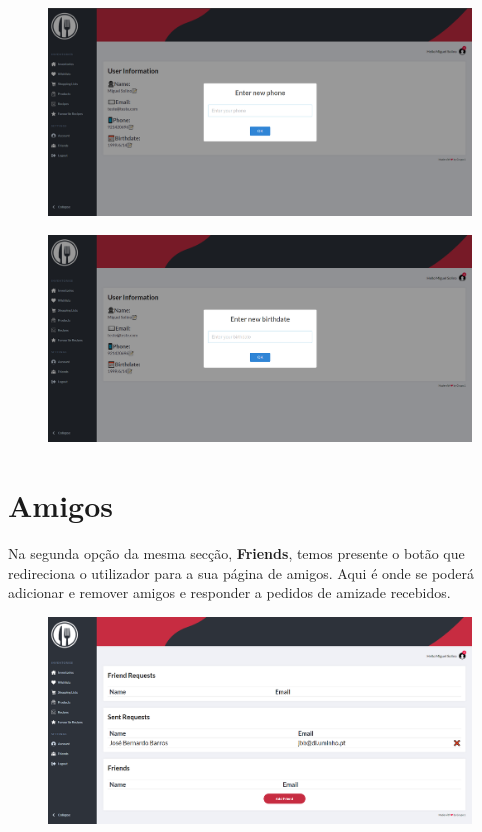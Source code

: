 \documentclass[a4paper]{report}
\begin{document}
    \begin{figure}[H]
        \centering
            \includegraphics[width=\textwidth]{images/produto_final/alterar_numero_perfil.png}
    \end{figure}

    \begin{figure}[H]
        \centering
            \includegraphics[width=\textwidth]{images/produto_final/alterar_nascimento_iventario.png}
    \end{figure}

    \section{Amigos}

    Na segunda opção da mesma secção, \textbf{Friends}, temos presente o botão
    que redireciona o utilizador para a sua página de amigos. Aqui é onde 
    se poderá adicionar e remover amigos e responder a pedidos de amizade
    recebidos. 

    \begin{figure}[H]
        \centering
            \includegraphics[width=\textwidth]{images/produto_final/pedido_amigos_enviado.png}
    \end{figure}
\end{document}
